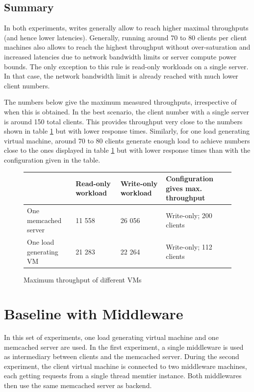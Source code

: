 \documentclass[11pt,a4paper]{article}
\begin{document}
\subsection{Summary}
In both experiments, writes generally allow to reach higher maximal throughputs (and hence lower latencies). Generally, running around 70 to 80 clients per client machines also allows to reach the highest throughput without over-saturation and increased latencies due to network bandwidth limits or server compute power bounds. The only exception to this rule is read-only workloads on a single server. In that case, the network bandwidth limit is already reached with much lower client numbers.

The numbers below give the maximum measured throughputs, irrespective of when this is obtained. In the best scenario, the client number with a single server is around 150 total clients. This provides throughput very close to the numbers shown in table \ref{table::max_through_section_2} but with lower response times. Similarly, for one load generating virtual machine, around 70 to 80 clients generate enough load to achieve numbers close to the ones displayed in table \ref{table::max_through_section_2} but with lower response times than with the configuration given in the table.

\begin{figure}
    \centering
    \begin{tabular}{|l|p{2cm}|p{2cm}|p{4cm}|}
        \hline                        & Read-only workload & Write-only workload & Configuration gives max. throughput \\
        \hline One memcached server   &             11 558 &              26 056 &             Write-only; 200 clients \\
        \hline One load generating VM &             21 283 &              22 264 &             Write-only; 112 clients \\
        \hline
    \end{tabular}
    \caption{Maximum throughput of different VMs}
    \label{table::max_through_section_2}
\end{figure}



\newpage

\section{Baseline with Middleware}
In this set of experiments, one load generating virtual machine and one memcached server are used. In the first experiment, a single middleware is used as intermediary between clients and the memcached server. During the second experiment, the client virtual machine is connected to two middleware machines, each getting requests from a single thread memtier instance. Both middlewares then use the same memcached server as backend.
\end{document}
